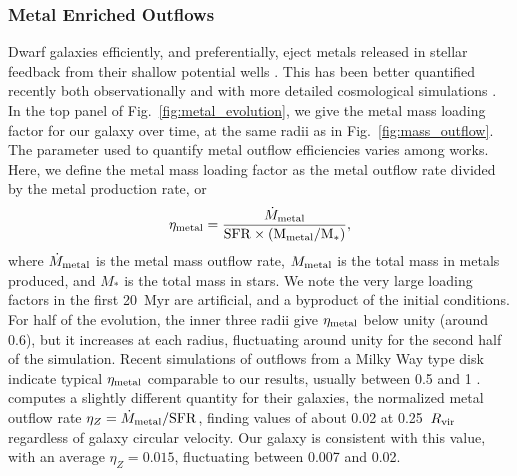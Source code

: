 \documentclass[fleqn,usenatbib,useAMS]{mnras}
\begin{document}
\subsubsection{Metal Enriched Outflows}
Dwarf galaxies efficiently, and preferentially, eject metals released in stellar feedback from their shallow potential wells \citep{MacLowFerrara1999,FerraraTolstoy2000}. This has been better quantified recently both observationally \citep[e.g.][]{Kirby2011-metals,Zahid2012,Peeples2014,McQuinn2015} and with more detailed cosmological simulations \citep{Simpson2013,Angles-Alcazar2017,Muratov2017}. In the top panel of Fig.~\ref{fig:metal_evolution}, we give the metal mass loading factor for our galaxy over time, at the same radii as in Fig.~\ref{fig:mass_outflow}. The parameter used to quantify metal outflow efficiencies varies among works. Here, we define the metal mass loading factor as the metal outflow rate divided by the metal production rate, or
\begin{equation} \label{eq:eta-metal}
\eta_{\rm metal} = \frac{\dot{M}_{\rm metal}}{\rm{SFR} \times (M_{\rm metal}/M_{*})},
\end{equation}
where $\dot{M}_{\rm metal}$ is the metal mass outflow rate, $M_{\rm metal}$ is the total mass in metals produced, and $M_{*}$ is the total mass in stars. We note the very large loading factors in the first 20~Myr are artificial, and a byproduct of the initial conditions. For half of the evolution, the inner three radii give $\eta_{\rm metal}$ below unity (around 0.6), but it increases at each radius, fluctuating around unity for the second half of the simulation. Recent simulations of outflows from a Milky Way type disk indicate typical $\eta_{\rm metal}$ comparable to our results, usually between 0.5 and 1 \citep{Li2017,Fielding2017}. \cite{Muratov2017} computes a slightly different quantity for their galaxies, the normalized metal outflow rate $\eta_{Z} = \dot{M}_{\rm metal}/{\rm SFR}$, finding values of about 0.02 at 0.25~$R_{\rm vir}$ regardless of galaxy circular velocity. Our galaxy is consistent with this value, with an average $\eta_Z = 0.015$, fluctuating between 0.007 and 0.02.
\end{document}
